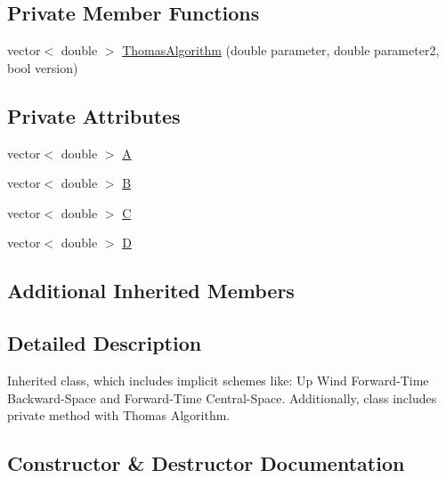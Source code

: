 \subsection*{Private Member Functions}
\begin{DoxyCompactItemize}
\item 
vector$<$ double $>$ \mbox{\hyperlink{class_implicit_scheme_a2f0cee270b60bc42f8f5e864255f5e29}{Thomas\+Algorithm}} (double parameter, double parameter2, bool version)
\end{DoxyCompactItemize}
\subsection*{Private Attributes}
\begin{DoxyCompactItemize}
\item 
vector$<$ double $>$ \mbox{\hyperlink{class_implicit_scheme_a9bd3d0a458683f9a17e8d11016c9f879}{A}}
\item 
vector$<$ double $>$ \mbox{\hyperlink{class_implicit_scheme_affeedb3fe9f7ebb8be113c884dd09a97}{B}}
\item 
vector$<$ double $>$ \mbox{\hyperlink{class_implicit_scheme_ab9059b52250e0afdd41b855299e6cf71}{C}}
\item 
vector$<$ double $>$ \mbox{\hyperlink{class_implicit_scheme_a30dad74ec599966b5ba7965f382d28cb}{D}}
\end{DoxyCompactItemize}
\subsection*{Additional Inherited Members}


\subsection{Detailed Description}
Inherited class, which includes implicit schemes like\+: Up Wind Forward-\/\+Time Backward-\/\+Space and Forward-\/\+Time Central-\/\+Space. Additionally, class includes private method with Thomas Algorithm. 

\subsection{Constructor \& Destructor Documentation}
\mbox{\label{class_implicit_scheme_a7bb3a64ab8d7ca0b58ed4ba9817b8c12}} 
